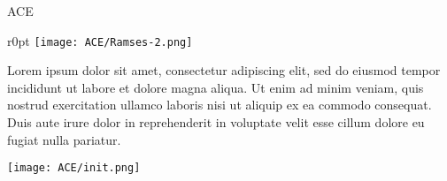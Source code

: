 \begin{section}{ACE}{}
  \begin{minipage}{\linewidth}
    \begin{wrapfigure}{r}{0pt}
      \texttt{[image: ACE/Ramses-2.png]}
    \end{wrapfigure}
    \strut {\small Lorem ipsum dolor sit amet, consectetur adipiscing elit, sed
      do eiusmod tempor incididunt ut labore et dolore magna aliqua. Ut enim ad
      minim veniam, quis nostrud exercitation ullamco laboris nisi ut aliquip ex
      ea commodo consequat. Duis aute irure dolor in reprehenderit in voluptate
      velit esse cillum dolore eu fugiat nulla pariatur.}
  \end{minipage}

  \vspace{0.5cm}

  \begin{minipage}{\linewidth}
    \begin{center}
      \texttt{[image: ACE/init.png]}
    \end{center}
  \end{minipage}
\end{section}